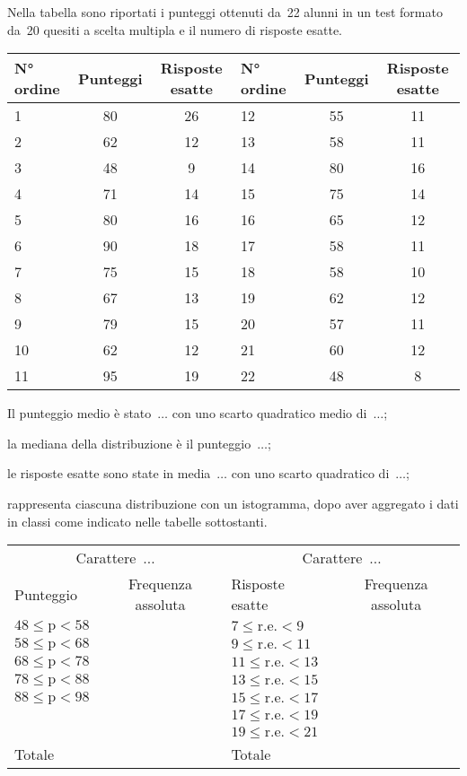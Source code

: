 \begin{esercizio}
\label{ese:A.45}
Nella tabella sono riportati i punteggi ottenuti da~22 alunni in un test formato da~20 quesiti a scelta multipla e il numero di risposte esatte.
\begin{center}
\begin{tabular}{*{2}{lcc}}
\toprule
N° ordine & Punteggi & Risposte esatte &N° ordine & Punteggi & Risposte esatte\\
\midrule
1 & 80 & 26 &12 & 55 & 11 \\
2 & 62 & 12 &13 & 58 & 11 \\
3 & 48 & 9 &14 & 80 & 16 \\
4 & 71 & 14 &15 & 75 & 14 \\
5 & 80 & 16 &16 & 65 & 12 \\
6 & 90 & 18 &17 & 58 & 11 \\
7 & 75 & 15 &18 & 58 & 10 \\
8 & 67 & 13 &19 & 62 & 12 \\
9 & 79 & 15 &20 & 57 & 11 \\
10 & 62 & 12 &21 & 60 & 12 \\
11 & 95 & 19 &22 & 48 & 8 \\
\bottomrule
\end{tabular}
\end{center}
\begin{enumeratea}
 \item Il punteggio medio è stato~$\dots$ con uno scarto quadratico medio di~$\dots$;
 \item la mediana della distribuzione è il punteggio~$\dots$;
 \item le risposte esatte sono state in media~$\dots$ con uno scarto quadratico di~$\dots$;
 \item rappresenta ciascuna distribuzione con un istogramma, dopo aver aggregato i dati in classi come indicato nelle tabelle sottostanti.
\end{enumeratea}

\begin{center}
\begin{tabular}{*{2}{lc}}
\toprule
\multicolumn{2}{c}{Carattere~$\dots$} & \multicolumn{2}{c}{Carattere~$\dots$} \\
Punteggio & Frequenza assoluta & Risposte esatte & Frequenza assoluta \\
\midrule
$48 \leq \text{p} < 58$ &  & $7 \leq \text{r.e.} < 9$ & \\
$58 \leq \text{p} < 68$ &  & $9 \leq \text{r.e.} < 11$ & \\
$68 \leq \text{p} < 78$ &  & $11 \leq \text{r.e.} < 13$ & \\
$78 \leq \text{p} < 88$ &  & $13 \leq \text{r.e.} < 15$ & \\
$88 \leq \text{p} < 98$ &  & $15 \leq \text{r.e.} < 17$ & \\
 &  & $17 \leq \text{r.e.} < 19$ & \\
 &  & $19 \leq \text{r.e.} < 21$ & \\
 \midrule
Totale & & Totale & \\
\bottomrule
\end{tabular}
\end{center}
\end{esercizio}

